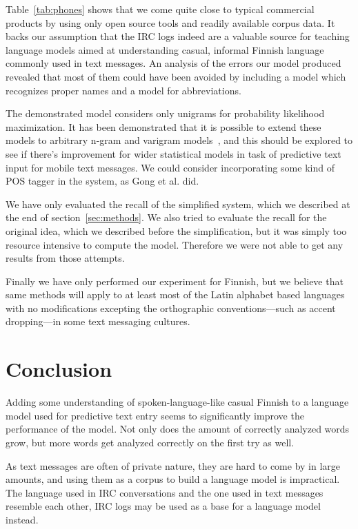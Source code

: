 \documentclass[a4paper,conference]{IEEEtran}
\begin{document}
Table~\ref{tab:phones} shows that we come quite close to typical
commercial products by using only open source tools and readily
available corpus data. It backs our assumption that the IRC logs
indeed are a valuable source for teaching language models aimed at
understanding casual, informal Finnish language commonly used in text
messages. An analysis of the errors our model produced revealed
that most of them could have been avoided by including a model which
recognizes proper names and a model for abbreviations.

The demonstrated model considers only unigrams for probability
likelihood maximization. It has been demonstrated that it is possible
to extend these models to arbitrary n-gram and varigram
models~\cite{Silfverberg/2011}, and this should be explored to see if
there's improvement for wider statistical models in task of predictive
text input for mobile text messages. We could consider incorporating
some kind of POS tagger in the system, as Gong et al. \cite{gong/2008}
did.

We have only evaluated the recall of the simplified system, which we
described at the end of section~\ref{sec:methods}. We also tried to
evaluate the recall for the original idea, which we described before
the simplification, but it was simply too resource intensive to
compute the model. Therefore we were not able to get any results from
those attempts.

Finally we have only performed our experiment for Finnish, but we
believe that same methods will apply to at least most of the Latin
alphabet based languages with no modifications excepting the
orthographic conventions---such as accent dropping---in some text messaging
cultures.

\section{Conclusion}
\label{sec:conclusions}
Adding some understanding of spoken-language-like casual Finnish to a
language model used for predictive text entry seems to significantly
improve the performance of the model. Not only does the amount of
correctly analyzed words grow, but more words get analyzed correctly
on the first try as well.

As text messages are often of private nature, they are hard to come by
in large amounts, and using them as a corpus to build a language model
is impractical. The language used in IRC conversations and the one
used in text messages resemble each other, IRC logs may be used as a
base for a language model instead.
\end{document}
